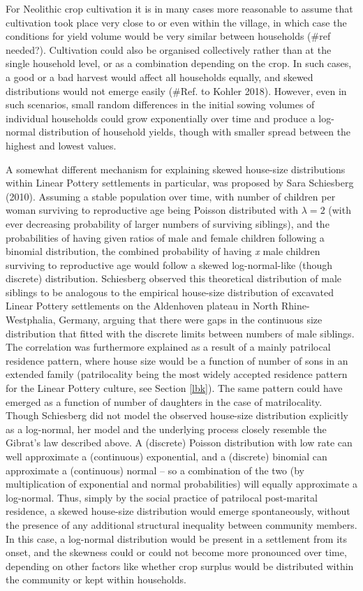 \documentclass[
  12pt,
  a4paper, twoside]{book}
\begin{document}
For Neolithic crop cultivation it is in many cases more reasonable to assume that cultivation took place very close to or even within the village, in which case the conditions for yield volume would be very similar between households (\#ref needed?). Cultivation could also be organised collectively rather than at the single household level, or as a combination depending on the crop. In such cases, a good or a bad harvest would affect all households equally, and skewed distributions would not emerge easily (\#Ref. to Kohler 2018). However, even in such scenarios, small random differences in the initial sowing volumes of individual households could grow exponentially over time and produce a log-normal distribution of household yields, though with smaller spread between the highest and lowest values.

A somewhat different mechanism for explaining skewed house-size distributions within Linear Pottery settlements in particular, was proposed by Sara Schiesberg (2010). Assuming a stable population over time, with number of children per woman surviving to reproductive age being Poisson distributed with \(\lambda = 2\) (with ever decreasing probability of larger numbers of surviving siblings), and the probabilities of having given ratios of male and female children following a binomial distribution, the combined probability of having \emph{x} male children surviving to reproductive age would follow a skewed log-normal-like (though discrete) distribution. Schiesberg observed this theoretical distribution of male siblings to be analogous to the empirical house-size distribution of excavated Linear Pottery settlements on the Aldenhoven plateau in North Rhine-Westphalia, Germany, arguing that there were gaps in the continuous size distribution that fitted with the discrete limits between numbers of male siblings. The correlation was furthermore explained as a result of a mainly patrilocal residence pattern, where house size would be a function of number of sons in an extended family (patrilocality being the most widely accepted residence pattern for the Linear Pottery culture, see Section \ref{lbk}). The same pattern could have emerged as a function of number of daughters in the case of matrilocality. Though Schiesberg did not model the observed house-size distribution explicitly as a log-normal, her model and the underlying process closely resemble the Gibrat's law described above. A (discrete) Poisson distribution with low rate can well approximate a (continuous) exponential, and a (discrete) binomial can approximate a (continuous) normal -- so a combination of the two (by multiplication of exponential and normal probabilities) will equally approximate a log-normal. Thus, simply by the social practice of patrilocal post-marital residence, a skewed house-size distribution would emerge spontaneously, without the presence of any additional structural inequality between community members. In this case, a log-normal distribution would be present in a settlement from its onset, and the skewness could or could not become more pronounced over time, depending on other factors like whether crop surplus would be distributed within the community or kept within households.
\end{document}
